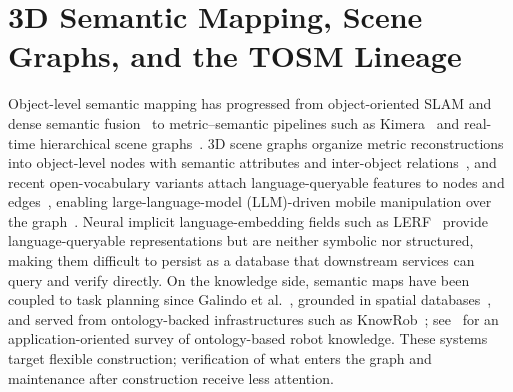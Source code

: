 \section{3D Semantic Mapping, Scene Graphs, and the TOSM Lineage}
\label{sec:rw-semantic}

Object-level semantic mapping has progressed from object-oriented SLAM and
dense semantic fusion~\cite{salas2013slampp,mccormac2017semanticfusion} to
metric--semantic pipelines such as Kimera~\cite{rosinol2020kimera} and
real-time hierarchical scene graphs~\cite{hughes2022hydra}. 3D scene graphs
organize metric reconstructions into object-level nodes with semantic
attributes and inter-object relations~\cite{armeni20193dsg}, and recent
open-vocabulary variants attach language-queryable features to nodes and
edges~\cite{koch2024open3dsg,gu2024conceptgraphs,werby2024}, enabling
large-language-model (LLM)-driven mobile manipulation over the
graph~\cite{honerkamp2024momallm}.
Neural implicit language-embedding fields such as LERF~\cite{kerr2023lerf}
provide language-queryable representations but are neither symbolic nor
structured, making them difficult to persist as a database that downstream
services can query and verify directly. On the knowledge side, semantic maps
have been coupled to task planning since Galindo et
al.~\cite{galindo2008task}, grounded in spatial databases~\cite{deeken2018semap},
and served from ontology-backed infrastructures such as
KnowRob~\cite{tenorth2013knowrob}; see~\cite{manzoor2021survey} for an
application-oriented survey of ontology-based robot knowledge. These systems
target flexible construction; verification of what enters the graph and
maintenance after construction receive less attention.

